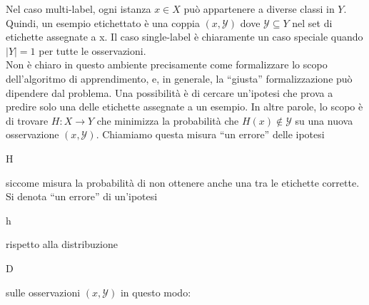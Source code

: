 \newline
Nel caso multi-label, ogni istanza \begin{math}
     x \in X 
    \end{math} pu\`o appartenere a diverse classi in \begin{math}
                                                      Y
                                                     \end{math}. Quindi, un esempio etichettato \`e una coppia 
\begin{math}(x,\mathcal{Y})\end{math} dove \begin{math}
                                  \mathcal{Y} \subseteq Y
                                 \end{math} nel set di etichette assegnate a x. Il caso single-label \`e 
chiaramente un caso speciale quando \begin{math} |Y| = 1   \end{math} per tutte le osservazioni.\\
Non \`e chiaro in questo ambiente precisamente come formalizzare lo scopo dell'algoritmo di apprendimento, e, in 
generale, la ``giusta'' formalizzazione pu\`o dipendere dal problema. Una possibilit\`a \`e di cercare un'ipotesi 
che prova a predire solo una delle etichette assegnate a un esempio. In altre parole, lo scopo \`e di trovare 
\begin{math} H : X \rightarrow Y\end{math} che minimizza la probabilit\`a che 
\begin{math}
 H(x) \notin \mathcal{Y}
\end{math} su una nuova osservazione \begin{math}
                                      (x,\mathcal{Y})
                                     \end{math}. Chiamiamo questa misura ``un errore'' delle ipotesi 
\begin{it}H\end{it} siccome misura la probabilit\`a di non ottenere anche una tra le etichette corrette. 
Si denota ``un errore'' di un'ipotesi \begin{it}h\end{it} rispetto alla distribuzione \begin{it}D\end{it} 
sulle osservazioni \begin{math}(x,\mathcal{Y})\end{math} in questo modo:
